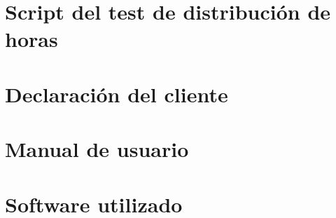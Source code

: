 \documentclass[a4paper,12pt]{book}
\begin{document}


\appendix

\chapter{Script del test de distribución de horas}
\label{apx:script_distribucion}
\thispagestyle{empty}


\chapter{Declaración del cliente}
\label{apx:declaracion_cliente}
\thispagestyle{empty}


\chapter{Manual de usuario}
\label{apx:manual_usuario}
\thispagestyle{empty}


\chapter{Software utilizado}
\label{apx:software_utilizado}
\thispagestyle{empty}


% 
\end{document}
